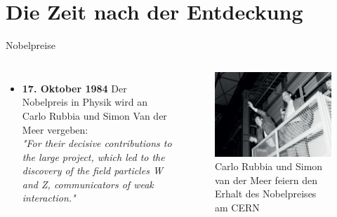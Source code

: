 \documentclass[aspectratio=1610, professionalfonts, 10pt]{beamer}
\begin{document}
\section{Die Zeit nach der Entdeckung}


\begin{frame}{Nobelpreise}
	\begin{columns}
				\begin{itemize}
					\setlength\itemsep{0.5em}
					\vspace*{-20px}
					\item \textbf{17. Oktober 1984} Der Nobelpreis in Physik wird an Carlo Rubbia und Simon Van der Meer vergeben: \\
					\emph{"For their decisive contributions to the large project, which led to the discovery of the field particles W and Z, communicators of weak interaction."}
				\end{itemize}
			\begin{figure}
	  			\centering
				\includegraphics[width=\linewidth]{Images/CCint5_08_14}
				\caption{Carlo Rubbia und Simon van der Meer feiern den Erhalt des Nobelpreises am CERN \cite{CERN-PHOTO-8410523}}
	  			\label{fig:sad}
			\end{figure}
	\end{columns}
\end{frame}
\end{document}
